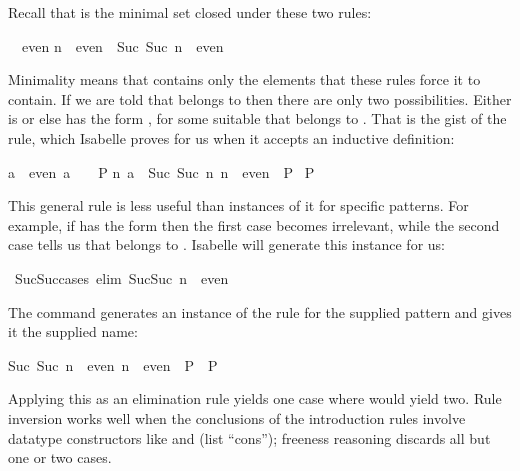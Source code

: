 \begin{isabellebody}
\begin{isamarkuptext}
Recall that  is the minimal set closed under these two rules:
\begin{isabelle}%
{}\ {\isasymin}\ even\isasep\isanewline%
n\ {\isasymin}\ even\ {\isasymLongrightarrow}\ Suc\ {\isacharparenleft}Suc\ n{\isacharparenright}\ {\isasymin}\ even%
\end{isabelle}
Minimality means that  contains only the elements that these
rules force it to contain.  If we are told that 
belongs to
 then there are only two possibilities.  Either  is 
or else  has the form , for some suitable 
that belongs to
.  That is the gist of the  rule, which Isabelle proves
for us when it accepts an inductive definition:
\begin{isabelle}%
{\isasymlbrakk}a\ {\isasymin}\ even{\isacharsemicolon}\ a\ {\isacharequal}\ {}\ {\isasymLongrightarrow}\ P{\isacharsemicolon}\isanewline
\isaindent{\ }{\isasymAnd}n{\isachardot}\ {\isasymlbrakk}a\ {\isacharequal}\ Suc\ {\isacharparenleft}Suc\ n{\isacharparenright}{\isacharsemicolon}\ n\ {\isasymin}\ even{\isasymrbrakk}\ {\isasymLongrightarrow}\ P{\isasymrbrakk}\isanewline
{\isasymLongrightarrow}\ P%
\end{isabelle}
This general rule is less useful than instances of it for
specific patterns.  For example, if  has the form
 then the first case becomes irrelevant, while the second
case tells us that  belongs to .  Isabelle will generate
this instance for us:%
\end{isamarkuptext}%
\isamarkuptrue%
\isamarkupfalse%
\ Suc{\isacharunderscore}Suc{\isacharunderscore}cases\ {\isacharbrackleft}elim{\isacharbang}{\isacharbrackright}{\isacharcolon}\ {\isachardoublequoteopen}Suc{\isacharparenleft}Suc\ n{\isacharparenright}\ {\isasymin}\ even{\isachardoublequoteclose}%
\begin{isamarkuptext}%
The  command generates an instance of
the  rule for the supplied pattern and gives it the supplied name:
\begin{isabelle}%
{\isasymlbrakk}Suc\ {\isacharparenleft}Suc\ n{\isacharparenright}\ {\isasymin}\ even{\isacharsemicolon}\ n\ {\isasymin}\ even\ {\isasymLongrightarrow}\ P{\isasymrbrakk}\ {\isasymLongrightarrow}\ P%
\end{isabelle}
Applying this as an elimination rule yields one case where 
would yield two.  Rule inversion works well when the conclusions of the
introduction rules involve datatype constructors like  and \isa{{\isacharhash}}
(list ``cons''); freeness reasoning discards all but one or two cases.


\end{isamarkuptext}
\end{isabellebody}
